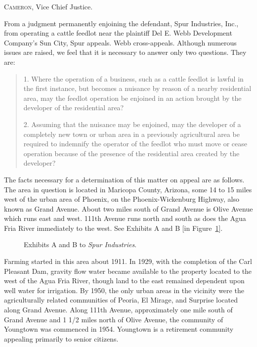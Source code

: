 

\opinion \textsc{Cameron}, Vice Chief Justice.

From a judgment permanently enjoining the defendant, Spur Industries, Inc., from
operating a cattle feedlot near the plaintiff Del E. Webb Development Company's
Sun City, Spur appeals. Webb cross-appeals. Although numerous issues are raised,
we feel that it is necessary to answer only two questions. They are:
\begin{quote}
1. Where the operation of a business, such as a cattle feedlot is lawful in the
first instance, but becomes a nuisance by reason of a nearby residential area,
may the feedlot operation be enjoined in an action brought by the developer of
the residential area?

2. Assuming that the nuisance may be enjoined, may the developer of a completely
new town or urban area in a previously agricultural area be required to
indemnify the operator of the feedlot who must move or cease operation because
of the presence of the residential area created by the developer?
\end{quote}
The facts necessary for a determination of this matter on appeal are as follows.
The area in question is located in Maricopa County, Arizona, some 14 to 15 miles
west of the urban area of Phoenix, on the Phoenix-Wickenburg Highway, also known
as Grand Avenue. About two miles south of Grand Avenue is Olive Avenue which
runs east and west. 111th Avenue runs north and south as does the Agua Fria
River immediately to the west. See Exhibits A and B [in
Figure~\ref{f:nuisance-spur}].

\begin{figure}
\begin{center}
\end{center}
\caption{Exhibits A and B to \emph{Spur Industries}.}
\label{f:nuisance-spur}
\end{figure}

Farming started in this area about 1911. In 1929, with the completion of the
Carl Pleasant Dam, gravity flow water became available to the property located
to the west of the Agua Fria River, though land to the east remained dependent
upon well water for irrigation. By 1950, the only urban areas in the vicinity
were the agriculturally related communities of Peoria, El Mirage, and Surprise
located along Grand Avenue. Along 111th Avenue, approximately one mile south of
Grand Avenue and 1 1/2 miles north of Olive Avenue, the community of Youngtown
was commenced in 1954. Youngtown is a retirement community appealing primarily
to senior citizens.


